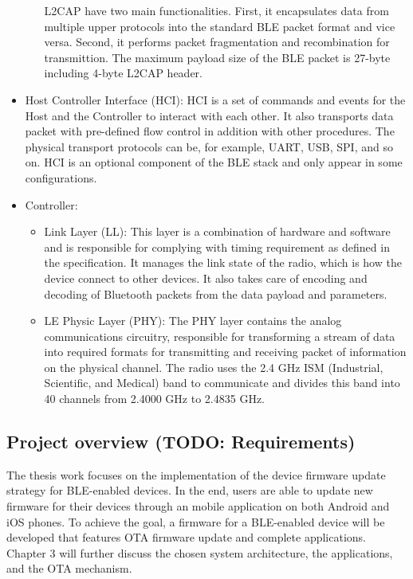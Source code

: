 \begin{itemize}
\begin{itemize}
                L2CAP have two main functionalities.
                First, it encapsulates data from multiple upper protocols
                into the standard BLE packet format and vice versa. 
                Second, it performs packet fragmentation and recombination for
                transmittion.
                The maximum payload size of the BLE packet is 27-byte including
                4-byte L2CAP header. \cite[p.~25]{TCAD14}
        \end{itemize}
    \item Host Controller Interface (HCI):
        HCI is a set of commands and events for the Host and the Controller
        to interact with each other. It also transports data packet with 
        pre-defined flow control in addition with other procedures.
        The physical transport protocols can be, for example, UART, USB, 
        SPI, and so on. HCI is an optional component of the BLE stack and 
        only appear in some configurations. \cite[p.~24-25]{TCAD14}    
    \item Controller:
        \begin{itemize}
            \item Link Layer (LL):
                This layer is a combination of hardware and software and is 
                responsible for complying with timing requirement as defined
                in the specification. It manages the link state of the radio,
                which is how the device connect to other devices.
                It also takes care of encoding and decoding of Bluetooth packets 
                from the data payload and parameters. \cite[p.~17-18]{TCAD14} 
            \item LE Physic Layer (PHY):
                The PHY layer contains the analog communications circuitry,
                responsible for transforming a stream of data into required
                formats for transmitting and receiving packet of information
                on the physical channel. 
                The radio uses the 2.4 GHz ISM (Industrial, Scientific, and 
                Medical) band to communicate and divides this band into
                40 channels from 2.4000 GHz to 2.4835 GHz. \cite[p.~200]{Ble19}
        \end{itemize}
\end{itemize}

\subsection{Project overview (TODO: Requirements)}
\justify
The thesis work focuses on the implementation of the device firmware update strategy 
for BLE-enabled devices. In the end, users are able to update new firmware for their
devices through an mobile application on both Android and iOS phones. To achieve the
goal, a firmware for a BLE-enabled device will be developed that features OTA 
firmware update and complete applications. Chapter 3 will further discuss the chosen
system architecture, the applications, and the OTA mechanism. 

